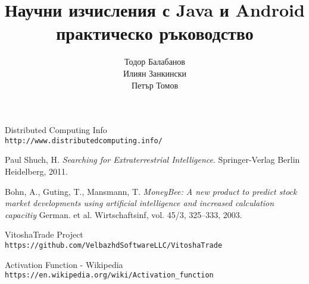 \documentclass[book,14pt,oneside,openany]{memoir}
\title{Научни изчисления с Java и Android \\ практическо ръководство}
\author{Тодор Балабанов \\ Илиян Занкински \\ Петър Томов}
\begin{document}
\maketitle

\thispagestyle{empty}

\newpage
{}

\newpage
\tableofcontents

\renewcommand\thesection{\thechapter.\arabic{section}}
\renewcommand\thesubsection{\thesection.\arabic{subsection}}











\newpage
\begin{thebibliography}{99}

 Distributed Computing Info  \\\texttt{http://www.distributedcomputing.info/}

 Paul Shuch, H. \textit{Searching for Extraterrestrial Intelligence}. Springer-Verlag Berlin Heidelberg, 2011.

 Bohn, A., Guting, T., Mansmann, T. \textit{MoneyBee: A new product to predict stock market developments using artificial intelligence and increased calculation capacitiy} German. et al. Wirtschaftsinf, vol. 45/3, 325--333, 2003.

 VitoshaTrade Project  \\\texttt{https://github.com/VelbazhdSoftwareLLC/VitoshaTrade}

 Activation Function - Wikipedia \\\texttt{https://en.wikipedia.org/wiki/Activation\_function}
\end{thebibliography}

\newpage
\listoffigures


\newpage
\printindex
\end{document}
